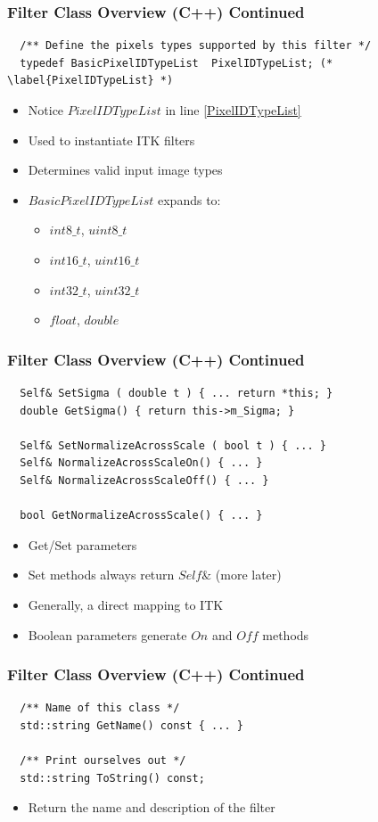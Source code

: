 \begin{frame}[fragile]
\frametitle{Filter Class Overview (C++) Continued}
\lstcpp
\begin{lstlisting}
  /** Define the pixels types supported by this filter */
  typedef BasicPixelIDTypeList  PixelIDTypeList; (* \label{PixelIDTypeList} *)

\end{lstlisting}
\begin{itemize}
  \item Notice $PixelIDTypeList$ in line \ref{PixelIDTypeList}
  \item Used to instantiate ITK filters
  \item Determines valid input image types
  \item $BasicPixelIDTypeList$ expands to:
  \begin{itemize}
    \item $int8\_t$, $uint8\_t$
    \item $int16\_t$, $uint16\_t$
    \item $int32\_t$, $uint32\_t$
    \item $float$, $double$
  \end{itemize}
\end{itemize}
\end{frame}


\begin{frame}[fragile]
\frametitle{Filter Class Overview (C++) Continued}
\lstcpp
\begin{lstlisting}
  Self& SetSigma ( double t ) { ... return *this; }
  double GetSigma() { return this->m_Sigma; }

  Self& SetNormalizeAcrossScale ( bool t ) { ... }
  Self& NormalizeAcrossScaleOn() { ... }
  Self& NormalizeAcrossScaleOff() { ... }

  bool GetNormalizeAcrossScale() { ... }
\end{lstlisting}
\begin{itemize}
  \item Get/Set parameters
  \item Set methods always return $Self\&$ (more later)
  \item Generally, a direct mapping to ITK
  \item Boolean parameters generate $On$ and $Off$ methods
\end{itemize}
\end{frame}


\begin{frame}[fragile]
\frametitle{Filter Class Overview (C++) Continued}
\lstcpp
\begin{lstlisting}
  /** Name of this class */
  std::string GetName() const { ... }

  /** Print ourselves out */
  std::string ToString() const;
\end{lstlisting}
\begin{itemize}
  \item Return the name and description of the filter
\end{itemize}
\end{frame}


